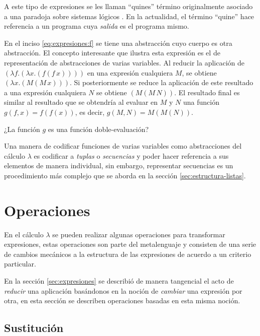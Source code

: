 A este tipo de expresiones se les llaman ``quines'' \cite[pp.~431--437]{Hofstadter:GEB} término originalmente asociado a una paradoja sobre sistemas lógicos \cite{Quine:Paradox}. En la actualidad, el término ``quine'' hace referencia a un programa cuya \emph{salida} es el programa mismo.

En el inciso \eqref{eq:expresiones:f} se tiene una abstracción cuyo cuerpo es otra abstracción. El concepto interesante que ilustra esta expresión es el de representación de abstracciones de varias variables. Al reducir la aplicación de \( (λf.(λx.(f(f\, x)))) \) en una expresión cualquiera \( M \), se obtiene \( (λx.(M(M\, x))) \). Si posteriormente se reduce la aplicación de este resultado a una expresión cualquiera \( N \) se obtiene \( (M(M\, N)) \). El resultado final es similar al resultado que se obtendría al evaluar en \( M \) y \( N \) una función \( g(f,x) = f(f(x)) \), es decir, \( g(M,N) = M(M(N)) \).

\begin{Gutu}
¿La función $g$ es una función doble-evaluación?
\end{Gutu}

Una manera de codificar funciones de varias variables como abstracciones del cálculo \( λ \) es codificar a \emph{tuplas} o \emph{secuencias} y poder hacer referencia a sus elementos de manera individual, sin embargo, representar secuencias es un procedimiento más complejo que se aborda en la sección \ref{sec:estructura-listas}.

\section{Operaciones}
\label{sec:operaciones}

En el cálculo \( λ \) se pueden realizar algunas operaciones para transformar expresiones, estas operaciones son parte del metalenguaje y consisten de una serie de cambios mecánicos a la estructura de las expresiones de acuerdo a un criterio particular.

En la sección \ref{sec:expresiones} se describió de manera tangencial el acto de \emph{reducir} una aplicación basándonos en la noción de \emph{cambiar} una expresión por otra, en esta sección se describen operaciones basadas en esta misma noción.

\subsection{Sustitución}
\label{sec:op-sustitucion}

